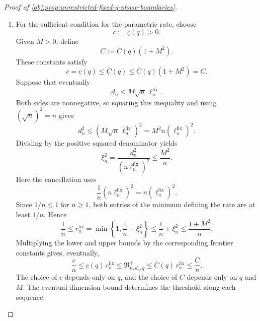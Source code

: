 \documentclass[11pt]{article}
\begin{document}
\begin{proof}[Proof of \cref{obj:prop:unrestricted-fixed-q-phase-boundaries}]
\begin{enumerate}
It remains to handle the truncation. If
\(r_n^{\mathrm{fix}}\to0\), then eventually
\[
r_n^{\mathrm{fix}}=\min\{1,\nu_n+\xi_n^2\}<1.
\]
At every such index,
\[
\nu_n+\xi_n^2<1,
\qquad
r_n^{\mathrm{fix}}=\nu_n+\xi_n^2:
\]
indeed, \(\nu_n+\xi_n^2\ge1\) would make the minimum equal to \(1\).
Thus \(\nu_n+\xi_n^2\to0\), and
\[
0\le\xi_n^2\le\nu_n+\xi_n^2
\]
implies \(\xi_n^2\to0\). Conversely, if \(\xi_n^2\to0\), then
\[
\nu_n+\xi_n^2\longrightarrow0,
\qquad
\min\{1,\nu_n+\xi_n^2\}\longrightarrow\min\{1,0\}=0,
\]
by continuity of addition and the minimum.

Consequently,
\[
r_n^{\mathrm{fix}}\longrightarrow0
\quad\Longleftrightarrow\quad
\xi_n^2\longrightarrow0
\quad\Longleftrightarrow\quad
\xi_n\longrightarrow0
\quad\Longleftrightarrow\quad
d_n=o\!\left(n\log(e+n)\right).
\]
Together with the risk comparison, this proves the first assertion.

\item For the sufficient condition for the parametric rate, choose
\[
c:=\underline c(q)>0.
\]
Given \(M>0\), define
\[
C:=\overline C(q)(1+M^2).
\]
These constants satisfy
\[
c=\underline c(q)
\le\overline C(q)
\le\overline C(q)(1+M^2)=C.
\]
Suppose that eventually
\[
d_n\le M\sqrt n\,\ell_n^{\mathrm{fix}}.
\]
Both sides are nonnegative, so squaring this inequality and using
\((\sqrt n)^2=n\) gives
\[
d_n^2
\le\left(M\sqrt n\,\ell_n^{\mathrm{fix}}\right)^2
=M^2n\left(\ell_n^{\mathrm{fix}}\right)^2.
\]
Dividing by the positive squared denominator yields
\[
\xi_n^2
=\frac{d_n^2}{(n\ell_n^{\mathrm{fix}})^2}
\le\frac{M^2}{n}.
\]
Here the cancellation uses
\[
\frac1n(n\ell_n^{\mathrm{fix}})^2
=n\left(\ell_n^{\mathrm{fix}}\right)^2.
\]
Since \(1/n\le1\) for \(n\ge1\), both entries of the minimum defining the rate are at least \(1/n\). Hence
\[
\frac1n
\le r_n^{\mathrm{fix}}
=\min\left\{1,\frac1n+\xi_n^2\right\}
\le\frac1n+\xi_n^2
\le\frac{1+M^2}{n}.
\]
Multiplying the lower and upper bounds by the corresponding frontier constants gives, eventually,
\[
\frac{c}{n}
\le\underline c(q)\,r_n^{\mathrm{fix}}
\le\mathfrak R^{+}_{n,d_n,q}
\le\overline C(q)\,r_n^{\mathrm{fix}}
\le\frac{C}{n}.
\]
The choice of \(c\) depends only on \(q\), and the choice of \(C\) depends only on \(q\) and \(M\). The eventual dimension bound determines the threshold along each sequence.


\end{enumerate}
\end{proof}
\end{document}
